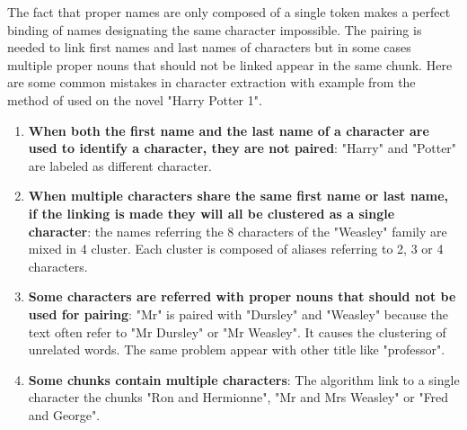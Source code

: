 \documentclass[a4paper, 12pt]{report}
\begin{document}
 The fact that proper names are only composed of a single token makes a perfect binding of names designating the same character impossible. The pairing is needed to link first names and last names of characters but in some cases multiple proper nouns that should not be linked appear in the same chunk. Here are some common mistakes in character extraction with example from the method of \cite{original} used on the novel "Harry Potter 1".
\begin{enumerate}
    \item \textbf{When both the first name and the last name of a character are used to identify a character, they are not paired}: "Harry" and "Potter" are labeled as different character.
    
    \item \textbf{When multiple characters share the same first name or last name, if the linking is made they will all be clustered as a single character}: the names referring the 8 characters of the "Weasley" family are mixed in 4 cluster. Each cluster is composed of aliases referring to 2, 3 or 4 characters.
    
    \item \textbf{Some characters are referred with proper nouns that should not be used for pairing}: "Mr" is paired with "Dursley" and "Weasley" because the text often refer to "Mr Dursley" or "Mr Weasley". It causes the clustering of unrelated words. The same problem appear with other title like "professor". 
    
    \item \textbf{Some chunks contain multiple characters}: The algorithm link to a single character the chunks "Ron and Hermionne", "Mr and Mrs Weasley" or "Fred and George".
\end{enumerate}
\end{document}
